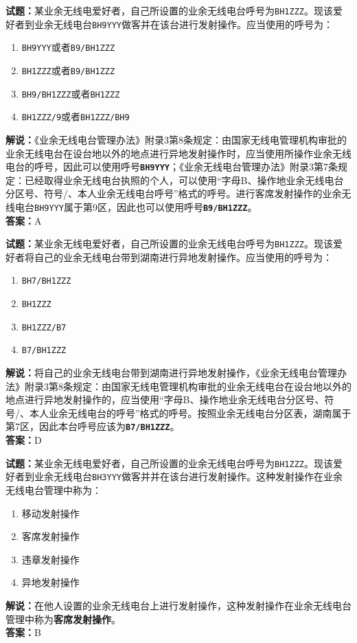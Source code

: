 \documentclass{ctexbook}
\begin{document}
\bigskip

\noindent\textbf{试题：}某业余无线电爱好者，自己所设置的业余无线电台呼号为\texttt{BH1ZZZ}。现该爱好者到业余无线电台\texttt{BH9YYY}做客并在该台进行发射操作。应当使用的呼号为：
\begin{enumerate}[leftmargin=3em]
  \item \texttt{BH9YYY}或者\texttt{B9/BH1ZZZ}
  \item \texttt{BH1ZZZ}或者\texttt{B9/BH1ZZZ}
  \item \texttt{BH9/BH1ZZZ}或者\texttt{BH1ZZZ}
  \item \texttt{BH1ZZZ/9}或者\texttt{BH1ZZZ/BH9}
\end{enumerate}
\noindent\textbf{解说：}《业余无线电台管理办法》附录3第8条规定：由国家无线电管理机构审批的业余无线电台在设台地以外的地点进行异地发射操作时，应当使用所操作业余无线电台的呼号，因此可以使用呼号\texttt{\textbf{BH9YYY}}；《业余无线电台管理办法》附录3第7条规定：已经取得业余无线电台执照的个人，可以使用“字母B、操作地业余无线电台分区号、符号/、本人业余无线电台呼号”格式的呼号。进行客席发射操作的业余无线电台\texttt{BH9YYY}属于第9区，因此也可以使用呼号\texttt{\textbf{B9/BH1ZZZ}}。\\\noindent\textbf{答案：}A

\bigskip

\noindent\textbf{试题：}某业余无线电爱好者，自己所设置的业余无线电台呼号为\texttt{BH1ZZZ}。现该爱好者将自己的业余无线电台带到湖南进行异地发射操作。应当使用的呼号为：
\begin{enumerate}[leftmargin=3em]
  \item \texttt{BH7/BH1ZZZ}
  \item \texttt{BH1ZZZ}
  \item \texttt{BH1ZZZ/B7}
  \item \texttt{B7/BH1ZZZ}
\end{enumerate}
\noindent\textbf{解说：}将自己的业余无线电台带到湖南进行异地发射操作，《业余无线电台管理办法》附录3第8条规定：由国家无线电管理机构审批的业余无线电台在设台地以外的地点进行异地发射操作的，应当使用“字母B、操作地业余无线电台分区号、符号/、本人业余无线电台的呼号”格式的呼号。按照业余无线电台分区表，湖南属于第7区，因此本台呼号应该为\texttt{\textbf{B7/BH1ZZZ}}。\\\noindent\textbf{答案：}D

\bigskip

\noindent\textbf{试题：}某业余无线电爱好者，自己所设置的业余无线电台呼号为\texttt{BH1ZZZ}。现该爱好者到业余无线电台\texttt{BH3YYY}做客并并在该台进行发射操作。这种发射操作在业余无线电台管理中称为：
\begin{enumerate}[leftmargin=3em]
  \item 移动发射操作
  \item 客席发射操作
  \item 违章发射操作
  \item 异地发射操作
\end{enumerate}
\noindent\textbf{解说：}在他人设置的业余无线电台上进行发射操作，这种发射操作在业余无线电台管理中称为\textbf{客席发射操作}。\\
\noindent\textbf{答案：}B
\end{document}
